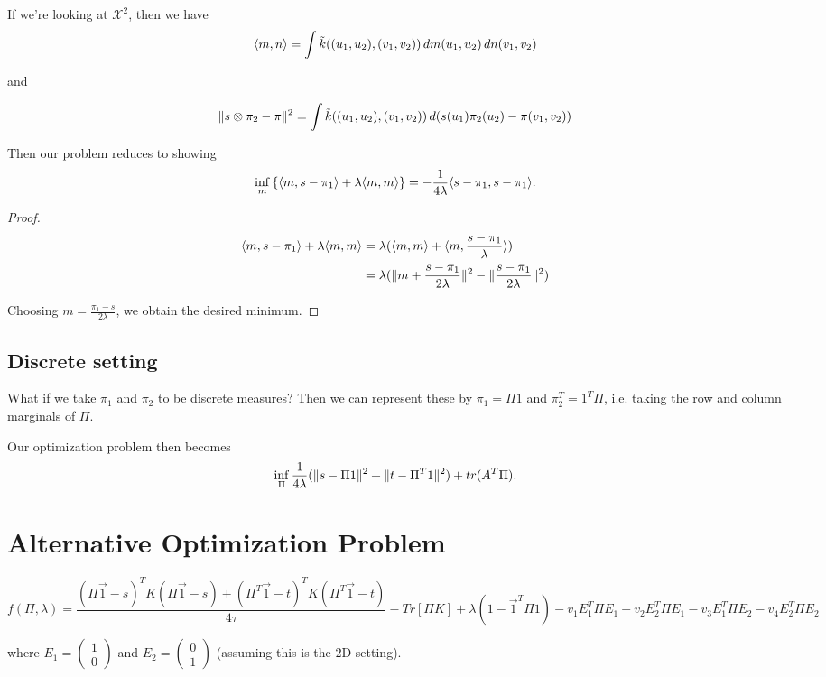 If we're looking at $\mathcal{X}^2$, then we have
$$
\langle m,n\rangle = \int \tilde{k}((u_1,u_2),(v_1,v_2))\,dm(u_1,u_2)\,dn(v_1,v_2)
$$

and

$$\lVert s\otimes \pi_2 - \pi\rVert^2 = \int \tilde{k}((u_1,u_2),(v_1,v_2))\,d(s(u_1)\pi_2(u_2)-\pi(v_1,v_2))$$

Then our problem reduces to showing $$\inf_m \left\lbrace \langle m,s-\pi_1\rangle + \lambda \langle m,m\rangle\right\rbrace  = -\frac{1}{4\lambda} \langle s-\pi_1,s-\pi_1\rangle.$$

\begin{proof}
	\begin{align*}
	\langle m,s-\pi_1\rangle + \lambda\langle m,m\rangle &= \lambda(\langle m,m\rangle+\langle m,\frac{s-\pi_1}{\lambda}\rangle) \\
	&= \lambda (\lVert m + \frac{s-\pi_1}{2\lambda}\rVert^2 - \lVert\frac{s-\pi_1}{2\lambda}\rVert^2)
	\end{align*}
	
	Choosing $m = \frac{\pi_1 - s}{2\lambda}$, we obtain the desired minimum.
\end{proof}
\subsection*{Discrete setting}

What if we take $\pi_1$ and $\pi_2$ to be discrete measures? Then we can represent these by $\pi_1 = \Pi 1$ and $\pi_2^T=1^{T}\Pi$, i.e. taking the row and column marginals of $\Pi$.

Our optimization problem then becomes $$\inf_{\Pi} \frac{1}{4\lambda} (\lVert s-\Pi 1\rVert^2+\lVert t-\Pi^{T} 1\rVert^2) + tr(A^{T}\Pi).$$

\section*{Alternative Optimization Problem}
$f(\Pi,\lambda)=\dfrac{(\Pi\vec{1}-s)^{T}K(\Pi\vec{1}-s)+(\Pi^{T}\vec{1}-t)^{T}K(\Pi^{T}\vec{1}-t)}{4\tau}-Tr[\Pi K]+\lambda(1-\vec{1}^{T}\Pi1)-v_{1}E_{1}^{T}\Pi E_{1}-v_{2}E_{2}^{T}\Pi E_{1}-v_{3}E_{1}^{T}\Pi E_{2}-v_{4}E_{2}^{T}\Pi E_{2}$

where $E_{1}=\left(\begin{array}{c}
1\\
0
\end{array}\right)$ and $E_{2}=\left(\begin{array}{c}
0\\
1
\end{array}\right)$ (assuming this is the 2D setting).

